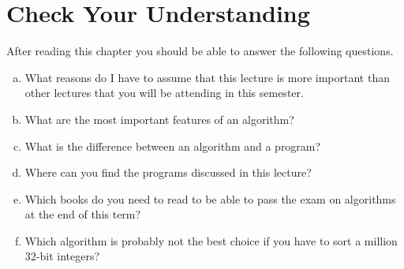 \section{Check Your Understanding}
After reading this chapter you should be able to answer the following questions.
\begin{enumerate}[(a)]
\item What reasons do I have to assume that this lecture is more important than other lectures that you will be
      attending in this semester.
\item What are the most important features of an algorithm?
\item What is the difference between an algorithm and a program?
\item Where can you find the programs discussed in this lecture?
\item Which books do you need to read to be able to pass the exam on algorithms at the end of this term?
\item Which algorithm is probably not the best choice if you have to sort a million 32-bit integers? 
\end{enumerate}

